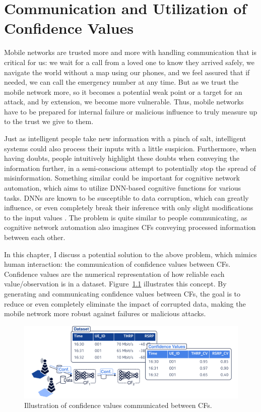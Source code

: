 \chapter{Communication and Utilization of Confidence Values}
	\label{cha:imputation}
	
	Mobile networks are trusted more and more with handling communication that is critical for us: we wait for a call from a loved one to know they arrived safely, we navigate the world without a map using our phones, and we feel assured that if needed, we can call the emergency number at any time.
	But as we trust the mobile network more, so it becomes a potential weak point or a target for an attack, and by extension, we become more vulnerable.
	Thus, mobile networks have to be prepared for internal failure or malicious influence to truly measure up to the trust we give to them.
	
	Just as intelligent people take new information with a pinch of salt, intelligent systems could also process their inputs with a little suspicion.
	Furthermore, when having doubts, people intuitively highlight these doubts when conveying the information further, in a semi-conscious attempt to potentially stop the spread of misinformation.
	Something similar could be important for cognitive network automation, which aims to utilize \ac{DNN}-based cognitive functions for various tasks.
	\acp{DNN} are known to be susceptible to data corruption, which can greatly influence, or even completely break their inference with only slight modifications to the input values \cite{adversarial_examp}.
	The problem is quite similar to people communicating, as cognitive network automation also imagines \acp{CF} conveying processed information between each other.
		
	In this chapter, I discuss a potential solution to the above problem, which mimics human interaction: the communication of confidence values between \acp{CF}.		
	Confidence values are the numerical representation of how reliable each value/observation is in a dataset.
	Figure~\ref{fig:conf_values} illustrates this concept.
	By generating and communicating confidence values between \acp{CF}, the goal is to reduce or even completely eliminate the impact of corrupted data, making the mobile network more robust against failures or malicious attacks.
	
	\begin{figure}[ht]
		\centering
		\includegraphics[width=\linewidth]{figures/12_imputation/conf_values/conf_values.pdf}
		\caption[Illustration of confidence values]{Illustration of confidence values communicated between CFs.}
		\label{fig:conf_values}
	\end{figure}
	
